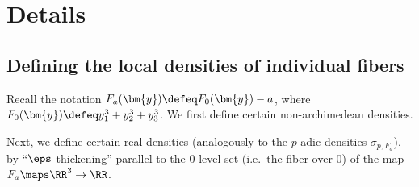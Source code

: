 \documentclass[12pt]{report}
\begin{document}
\section{Details}
\label{SEC:details-of-variance-analysis}



\subsection{Defining the local densities of individual fibers}

Recall the notation $F_a(\bm{y})\defeq F_0(\bm{y})-a$,
where $F_0(\bm{y})\defeq y_1^3+y_2^3+y_3^3$.
We first define certain non-archimedean densities.

Next,
we define certain real densities
(analogously to the $p$-adic densities $\sigma_{p,F_a}$),
by ``$\eps$-thickening'' parallel to the $0$-level set
(i.e.~the fiber over $0$)
of the map $F_a\maps\RR^3\to\RR$.

\end{document}
